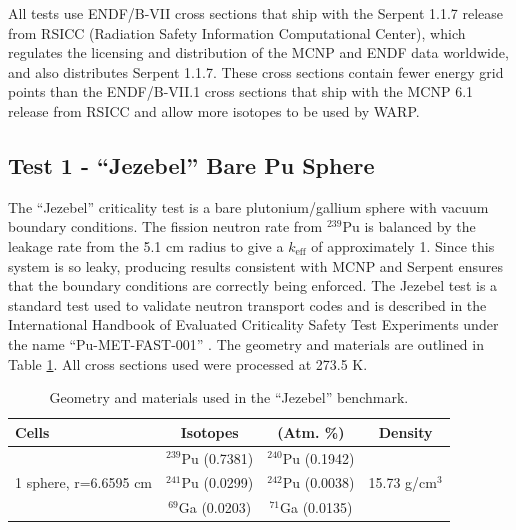 \documentclass[preprint,12pt]{elsarticle}
\begin{document}
All tests use ENDF/B-VII cross sections that ship with the Serpent 1.1.7 release from RSICC (Radiation Safety Information Computational Center), which regulates the licensing and distribution of the MCNP and ENDF data worldwide, and also distributes Serpent 1.1.7.  These cross sections contain fewer energy grid points than the ENDF/B-VII.1 cross sections that ship with the MCNP 6.1 release from RSICC and allow more isotopes to be used by WARP.%


\subsection{Test 1 - ``Jezebel'' Bare Pu Sphere}

The ``Jezebel'' criticality test is a bare plutonium/gallium sphere with vacuum boundary conditions.   The fission neutron rate from $^{239}$Pu is balanced by the leakage rate from the 5.1 cm radius to give a $k_\mathrm{eff}$ of approximately 1.  Since this system is so leaky, producing results consistent with MCNP and Serpent ensures that the boundary conditions are correctly being enforced.  The Jezebel test is a standard test used to validate neutron transport codes and is described in the International Handbook of Evaluated Criticality Safety Test Experiments under the name ``Pu-MET-FAST-001'' \cite{bench_handbook}.  The geometry and materials are outlined in Table \ref{jezebel_geom}.  All cross sections used were processed at 273.5 K.

\begin{table}[h]
\centering
\caption{Geometry and materials used in the ``Jezebel'' benchmark.}
\label{jezebel_geom}
\begin{tabular}{| l | c  c | c |}
\hline
Cells & Isotopes & (Atm. \%)& Density \\
\hline
\multirow{3}{*}{1 sphere, r=6.6595 cm }  &  $^{239}$Pu (0.7381)    &    $^{240}$Pu (0.1942)     &  \multirow{3}{*}{15.73 g/cm$^3$} \\
                                         &  $^{241}$Pu (0.0299)    &     $^{242}$Pu (0.0038)    &   \\
                                         &  $^{69}$Ga  (0.0203)    &     $^{71}$Ga  (0.0135)    &   \\
\hline
\end{tabular}
\end{table}
\end{document}
